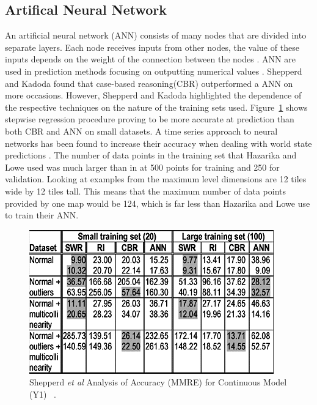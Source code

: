 \documentclass[journal]{IEEEtran}
\begin{document}
\subsection{Artifical Neural Network}
An artificial neural network (ANN) consists of many nodes that are divided into separate layers. Each node receives inputs from other nodes, the value of these inputs depends on the weight of the connection between the nodes \cite{lai2010prediction}. ANN are used in prediction methods focusing on outputting numerical values \cite{lai2010prediction, akdag2009estimation}. Shepperd and Kadoda \cite{shepperd2001comparing} found that case-based reasoning(CBR) outperformed a ANN on more occasions. However, Shepperd and Kadoda\cite{shepperd2001comparing} highlighted the dependence of the respective techniques on the nature of the training sets used. Figure~\ref{learningSets} shows stepwise regression procedure proving to be more accurate at prediction than both CBR and ANN on small datasets. A time series approach to neural networks has been found to increase their accuracy when dealing with world state predictions \cite{hazarika1998neural}. The number of data points in the training set that Hazarika and Lowe\cite{hazarika1998neural} used was much larger than in \cite{shepperd2001comparing} at 500 points for training and 250 for validation. Looking at examples from \cite{liapis2013sentient, alvarez2018fostering,  baldwin2017mixed} the maximum level dimensions are 12 tiles wide by 12 tiles tall. This means that the maximum number of data points provided by one map would be 124, which is far less than Hazarika and Lowe\cite{hazarika1998neural} use to train their ANN.

\begin{figure}[h]
	\includegraphics[width=1.0\linewidth]{trainingSets.PNG}
	\caption{Shepperd \textit{et al} Analysis of Accuracy (MMRE) for Continuous Model (Y1) ~\cite{shepperd2001comparing}.}
	\label{learningSets}
\end{figure} 
\end{document}
